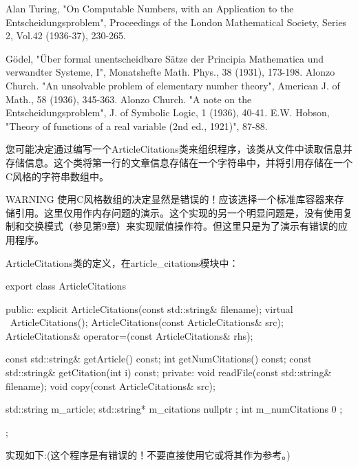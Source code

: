 \begin{shell}
Alan Turing, "On Computable Numbers, with an Application to the
Entscheidungsproblem", Proceedings of the London Mathematical Society, Series 2,
Vol.42 (1936-37), 230-265.

Gödel, "Über formal unentscheidbare Sätze der Principia Mathematica und verwandter
Systeme, I", Monatshefte Math. Phys., 38 (1931), 173-198.
Alonzo Church. "An unsolvable problem of elementary number theory", American J. of
Math., 58 (1936), 345-363.
Alonzo Church. "A note on the Entscheidungsproblem", J. of Symbolic Logic, 1
(1936), 40-41.
E.W. Hobson, "Theory of functions of a real variable (2nd ed., 1921)", 87-88.
\end{shell}


您可能决定通过编写一个ArticleCitations类来组织程序，该类从文件中读取信息并存储信息。这个类将第一行的文章信息存储在一个字符串中，并将引用存储在一个C风格的字符串数组中。

\begin{myWarning}{WARNING}
使用C风格数组的决定显然是错误的！应该选择一个标准库容器来存储引用。这里仅用作内存问题的演示。这个实现的另一个明显问题是，没有使用复制和交换模式（参见第9章）来实现赋值操作符。但这里只是为了演示有错误的应用程序。
\end{myWarning}

ArticleCitations类的定义，在article\_citations模块中：

\begin{cpp}
export class ArticleCitations
{
    public:
        explicit ArticleCitations(const std::string& filename);
        virtual ~ArticleCitations();
        ArticleCitations(const ArticleCitations& src);
        ArticleCitations& operator=(const ArticleCitations& rhs);

        const std::string& getArticle() const;
        int getNumCitations() const;
        const std::string& getCitation(int i) const;
    private:
        void readFile(const std::string& filename);
        void copy(const ArticleCitations& src);

        std::string m_article;
        std::string* m_citations { nullptr };
        int m_numCitations { 0 };
};
\end{cpp}

实现如下:(这个程序是有错误的！不要直接使用它或将其作为参考。)

